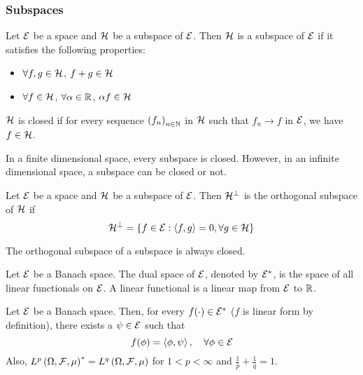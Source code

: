 \subsubsection{Subspaces}
\begin{definition}[subspace]
    Let $\mathcal{E}$ be a space and $\mathcal{H}$ be a subspace of $\mathcal{E}$. Then $\mathcal{H}$ is a subspace of $\mathcal{E}$ if it satisfies the following properties:
    \begin{itemize}
        \item $\forall f,g\in\mathcal{H}$, $f+g\in\mathcal{H}$
        \item $\forall f\in\mathcal{H}$, $\forall \alpha\in\mathbb{R}$, $\alpha f\in\mathcal{H}$
    \end{itemize}
\end{definition}
\begin{proposition}
    $\mathcal{H}$ is closed if for every sequence $\left(f_n\right)_{n\in\mathbb{N}}$ in $\mathcal{H}$ such that $f_n\rightarrow f$ in $\mathcal{E}$, we have $f\in\mathcal{H}$.
\end{proposition}
\begin{remark}
    In a finite dimensional space, every subspace is closed. However, in an infinite dimensional space, a subspace can be closed or not.
\end{remark}
\begin{definition}
    Let $\mathcal{E}$ be a space and $\mathcal{H}$ be a subspace of $\mathcal{E}$. Then $\mathcal{H}^{\perp}$ is the orthogonal subspace of $\mathcal{H}$ if
    \begin{equation*}
        \mathcal{H}^{\perp}=\left\{f\in\mathcal{E}:\left\langle f,g\right\rangle=0,\forall g\in\mathcal{H}\right\}
    \end{equation*}
\end{definition}
\begin{remark}
    The orthogonal subspace of a subspace is always closed.
\end{remark}

\begin{definition}
    Let $\mathcal{E}$ be a Banach space. The dual space of $\mathcal{E}$, denoted by $\mathcal{E}^*$, is the space of all linear functionals on $\mathcal{E}$. A linear functional is a linear map from $\mathcal{E}$ to $\mathbb{R}$.
\end{definition}

\begin{definition}
    Let $\mathcal{E}$ be a Banach space. Then, for every $f(\cdot)\in\mathcal{E}^*$ ($f$ is linear form by definition), there exists a $\psi \in\mathcal{E}$ such that \begin{equation*}
        f(\phi)=\left\langle \phi,\psi\right\rangle,\quad \forall \phi\in\mathcal{E}
    \end{equation*}
    Also, $L^p\left(\Omega, \mathcal{F}, \mu\right)^*=L^q\left(\Omega, \mathcal{F}, \mu\right)$ for $1<p<\infty$ and $\frac{1}{p}+\frac{1}{q}=1$.
\end{definition}
